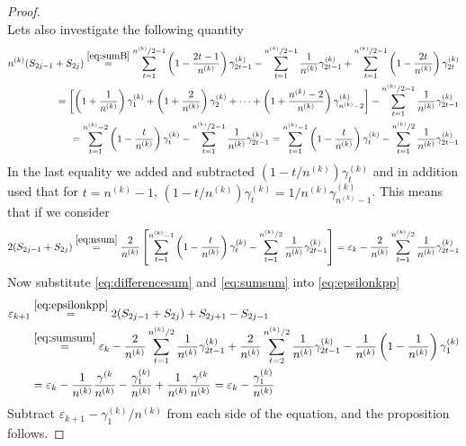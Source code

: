 \documentclass[11pt,english,a4paper]{article}
\begin{document}
\begin{proof}
\begin{equation}
\end{equation}
Lets also investigate the following quantity
\begin{align}
n^{(k)}(S_{2j-1} + S_{2j}) \stackrel{\eqref{eq:sumB} }{=} \sum_{t=1}^{n^{(k)}/2-1} \left( 1 - \frac{2t-1}{n^{(k)}}\right) \gamma^{(k)}_{2t - 1} -  \sum_{t=1}^{n^{(k)}/2-1} \frac{1}{n^{(k)}} \gamma^{(k)}_{2t - 1} + \sum_{t=1}^{n^{(k)}/2-1} \left( 1 - \frac{2t}{n^{(k)}}\right) \gamma^{(k)}_{2t}\nonumber\\
=\left[ \left(1 + \frac{1}{n^{(k)}}\right)\gamma^{(k)}_1 + \left(1 + \frac{2}{n^{(k)}}\right)\gamma^{(k)}_2  + \cdots + \left(1 + \frac{n^{(k)} - 2}{n^{(k)}} \right)\gamma^{(k)}_{n^{(k)} -2 }\right]-  \sum_{t=1}^{n^{(k)}/2-1} \frac{1}{n^{(k)}} \gamma^{(k)}_{2t - 1} \nonumber\\
= \sum_{t=1}^{n^{(k)} -2 } \left( 1 - \frac{t}{n^{(k)}} \right)\gamma^{(k)}_{t}-  \sum_{t=1}^{n^{(k)}/2-1} \frac{1}{n^{(k)}} \gamma^{(k)}_{2t - 1} = \sum_{t=1}^{n^{(k)} -1 } \left( 1 - \frac{t}{n^{(k)}} \right)\gamma^{(k)}_{t} -  \sum_{t=1}^{n^{(k)}/2} \frac{1}{n^{(k)}} \gamma^{(k)}_{2t - 1} \label{eq:nsum}
\end{align}
In the last equality we added and subtracted $(1-t/n^{(k)})\gamma^{(k)}_{t}$ and in addition used that for $t = n^{(k)} - 1$, $(1-t/n^{(k)})\gamma^{(k)}_{t} = 1/n^{(k)}\gamma^{(k)}_{n^{(k)} -1}$. This means that if we consider
\begin{align}
2(S_{2j-1} + S_{2j}) \stackrel{\eqref{eq:nsum}}{=} \frac{2}{n^{(k)}} \left[ \sum_{t=1}^{n^{(k)} -1 } \left( 1 - \frac{t}{n^{(k)}} \right)\gamma^{(k)}_{t} -  \sum_{t=1}^{n^{(k)}/2} \frac{1}{n^{(k)}} \gamma^{(k)}_{2t - 1} \right] = \varepsilon_k -\frac{2}{n^{(k)}} \sum_{t=1}^{n^{(k)}/2} \frac{1}{n^{(k)}} \gamma^{(k)}_{2t - 1} \label{eq:sumsum}
\end{align}
Now substitute \eqref{eq:differencesum} and \eqref{eq:sumsum} into \eqref{eq:epsilonkpp}
\begin{align*}
\varepsilon_{  k+1} &\stackrel{\eqref{eq:epsilonkpp}}{=} 2(S_{2j-1} + S_{2j}) + S_{2j+1} - S_{2j-1} \\
&\stackrel{\eqref{eq:sumsum}}{=} \varepsilon_k -\frac{2}{n^{(k)}} \sum_{t=1}^{n^{(k)}/2} \frac{1}{n^{(k)}} \gamma^{(k)}_{2t - 1}  + \frac{2}{n^{(k)}} \sum_{t=2}^{n^{(k)}/2} \frac{1}{n^{(k)}} \gamma^{(k)}_{2t - 1} - \frac{1}{n^{(k)}}\left( 1 - \frac{1}{n^{(k)}} \right) \gamma^{(k)}_{1}\\
&= \varepsilon_k - \frac{1}{n^{(k)}}\frac{\gamma^{(k}}{n^{(k)}}  - \frac{\gamma^{(k)}_1 }{n^{(k)}} + \frac{1}{n^{(k)}}\frac{\gamma^{(k}}{n^{(k)}} = \varepsilon_k - \frac{\gamma^{(k)}_1 }{n^{(k)}}
\end{align*}
Subtract $\varepsilon_{  k+1} - \gamma^{(k)}_1/n^{(k)}$ from each side of the equation, and the proposition follows.
\end{proof}
\end{document}
